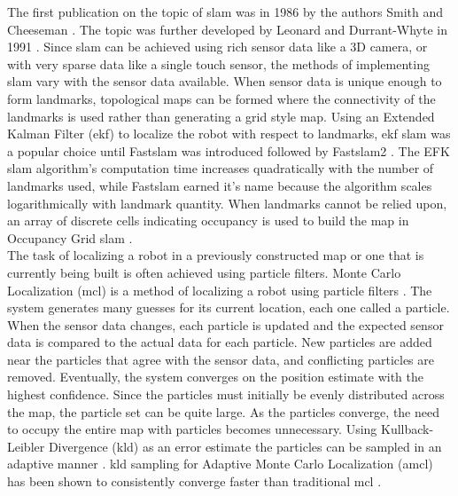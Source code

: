 The first publication on the topic of \acrshort{slam} was in 1986 by the authors Smith and Cheeseman \cite{smith1986,smith1990}. The topic was further developed by Leonard and Durrant-Whyte in 1991 \cite{len1991}. Since \acrshort{slam} can be achieved using rich sensor data like a 3D camera, or with very sparse data like a single touch sensor, the methods of implementing \acrshort{slam} vary with the sensor data available. When sensor data is unique enough to form landmarks, topological maps can be formed where the connectivity of the landmarks is used rather than generating a grid style map. Using an Extended Kalman Filter (\acrshort{ekf}) to localize the robot with respect to landmarks, \acrshort{ekf} \acrshort{slam} \cite{ekfslam} was a popular choice until Fast\acrshort{slam} \cite{fastslam} was introduced followed by Fast\acrshort{slam}2 \cite{fastslam2} . The EFK \acrshort{slam} algorithm's computation time increases quadratically with the number of landmarks used, while Fast\acrshort{slam} earned it's name because the algorithm scales logarithmically with landmark quantity. When landmarks cannot be relied upon, an array of discrete cells indicating occupancy is used to build the map in Occupancy Grid \acrshort{slam} \cite{graphslam}.\\

The task of localizing a robot in a previously constructed map or one that is currently being built is often achieved using particle filters. Monte Carlo Localization (\acrshort{mcl}) is a method of localizing a robot using particle filters \cite{mcl}. The system generates many guesses for its current location, each one called a particle. When the sensor data changes, each particle is updated and the expected sensor data is compared to the actual data for each particle. New particles are added near the particles that agree with the sensor data, and conflicting particles are removed. Eventually, the system converges on the position estimate with the highest confidence. Since the particles must initially be evenly distributed across the map, the particle set can be quite large. As the particles converge, the need to occupy the entire map with particles becomes unnecessary. Using Kullback-Leibler Divergence (\acrshort{kld}) as an error estimate the particles can be sampled in an adaptive manner \cite{kld,amcl}. \acrshort{kld} sampling for Adaptive Monte Carlo Localization (\acrshort{amcl}) has been shown to consistently converge faster than traditional \acrshort{mcl} \cite{kldproof}.\\

